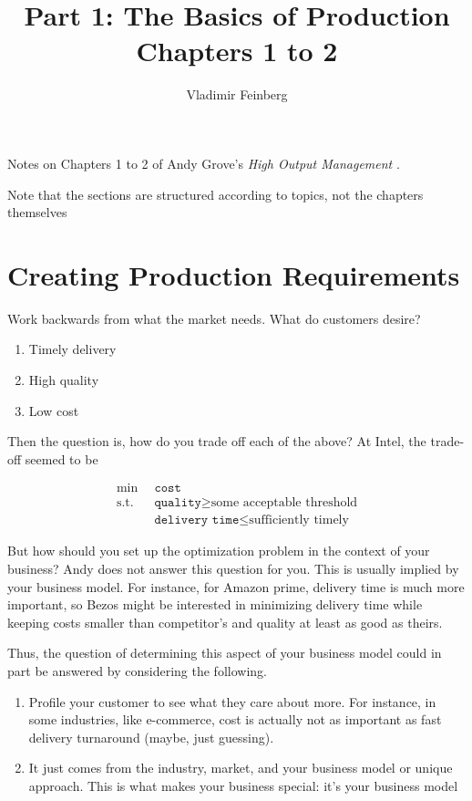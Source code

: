 \documentclass{article}
\title{Part 1: The Basics of Production\\Chapters 1 to 2}
\author{Vladimir Feinberg}
\begin{document}
\maketitle

Notes on Chapters 1 to 2 of Andy Grove's \textit{High Output Management} \cite{highoutput}.

Note that the sections are structured according to topics, not the chapters themselves

\section{Creating Production Requirements}

Work backwards from what the market needs. What do customers desire?

\begin{enumerate}
\item Timely delivery
\item High quality
\item Low cost
\end{enumerate}

Then the question is, how do you trade off each of the above? At Intel, the trade-off seemed to be

\begin{align*} 
  \min \,\,\,& \texttt{cost}\\
  \text{s.t.}\,\,\, & \texttt{quality}\ge \text{some acceptable threshold} \\
 & \texttt{delivery time}\le \text{sufficiently timely}
\end{align*}

But how should you set up the optimization problem in the context of your business? Andy does not answer this question for you. This is usually implied by your business model. For instance, for Amazon prime, delivery time is much more important, so Bezos might be interested in minimizing delivery time while keeping costs smaller than competitor's and quality at least as good as theirs.

Thus, the question of determining this aspect of your business model could in part be answered by considering the following.
\begin{enumerate}
\item Profile your customer to see what they care about more. For instance, in some industries, like e-commerce, cost is actually not as important as fast delivery turnaround (maybe, just guessing).
\item It just comes from the industry, market, and your business model or unique approach. This is what makes your business special: it's your business model
\end{enumerate}
\end{document}
